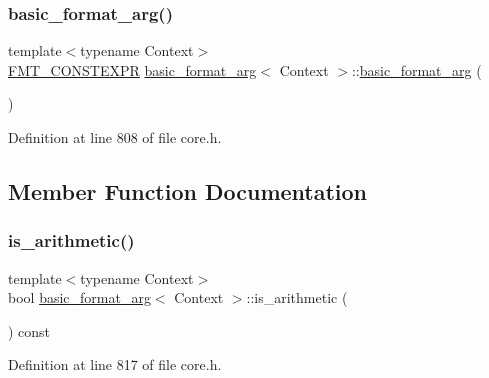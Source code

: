 \subsubsection{\texorpdfstring{basic\+\_\+format\+\_\+arg()}{basic\_format\_arg()}}
{\footnotesize\ttfamily template$<$typename Context$>$ \\
\hyperlink{core_8h_a69201cb276383873487bf68b4ef8b4cd}{F\+M\+T\+\_\+\+C\+O\+N\+S\+T\+E\+X\+PR} \hyperlink{classbasic__format__arg}{basic\+\_\+format\+\_\+arg}$<$ Context $>$\+::\hyperlink{classbasic__format__arg}{basic\+\_\+format\+\_\+arg} (\begin{DoxyParamCaption}{ }\end{DoxyParamCaption})\hspace{0.3cm}{\ttfamily [inline]}}



Definition at line 808 of file core.\+h.



\subsection{Member Function Documentation}
\mbox{\label{classbasic__format__arg_a14c5f1e0b933900dbc2d6fe1b6fd5ae1}} 
\subsubsection{\texorpdfstring{is\+\_\+arithmetic()}{is\_arithmetic()}}
{\footnotesize\ttfamily template$<$typename Context$>$ \\
bool \hyperlink{classbasic__format__arg}{basic\+\_\+format\+\_\+arg}$<$ Context $>$\+::is\+\_\+arithmetic (\begin{DoxyParamCaption}{ }\end{DoxyParamCaption}) const\hspace{0.3cm}{\ttfamily [inline]}}



Definition at line 817 of file core.\+h.

